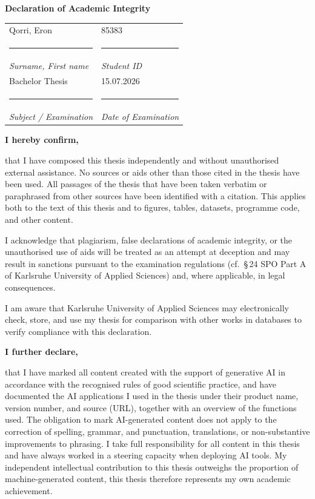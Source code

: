 \thispagestyle{empty}

{\huge\bfseries Declaration of Academic Integrity\par}
\vspace{10mm}

\noindent
\begin{tabular}{@{}l@{\qquad}l@{}}
Qorri, Eron & 85383 \\[-8pt]
\rule{7cm}{0.4pt} & \rule{4cm}{0.4pt} \\[-4pt]
\small\textit{Surname, First name} & \small\textit{Student ID} \\[12pt]
Bachelor Thesis & 15.07.2026 \\[-8pt]
\rule{7cm}{0.4pt} & \rule{4cm}{0.4pt} \\[-4pt]
\small\textit{Subject / Examination} & \small\textit{Date of Examination} \\
\end{tabular}

\bigskip\bigskip

\noindent\textbf{I hereby confirm,}

\medskip

\noindent
that I have composed this thesis independently and without unauthorised external assistance. No sources or aids other than those cited in the thesis have been used. All passages of the thesis that have been taken verbatim or paraphrased from other sources have been identified with a citation. This applies both to the text of this thesis and to figures, tables, datasets, programme code, and other content.

\medskip

\noindent
I acknowledge that plagiarism, false declarations of academic integrity, or the unauthorised use of aids will be treated as an attempt at deception and may result in sanctions pursuant to the examination regulations (cf.\ \S\,24 SPO Part A of Karlsruhe University of Applied Sciences) and, where applicable, in legal consequences.

\medskip

\noindent
I am aware that Karlsruhe University of Applied Sciences may electronically check, store, and use my thesis for comparison with other works in databases to verify compliance with this declaration.

\bigskip

\noindent\textbf{I further declare,}

\medskip

\noindent
that I have marked all content created with the support of generative AI in accordance with the recognised rules of good scientific practice, and have documented the AI applications I used in the thesis under their product name, version number, and source (URL), together with an overview of the functions used. The obligation to mark AI-generated content does not apply to the correction of spelling, grammar, and punctuation, translations, or non-substantive improvements to phrasing. I take full responsibility for all content in this thesis and have always worked in a steering capacity when deploying AI tools. My independent intellectual contribution to this thesis outweighs the proportion of machine-generated content, this thesis therefore represents my own academic achievement.

